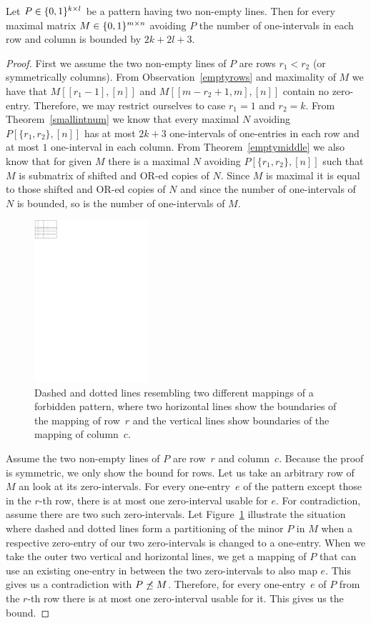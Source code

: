 \begin{lemma}
Let $P\in\{0,1\}^{k\times l}$ be a pattern having two non-empty lines. Then for every maximal matrix $M\in\{0,1\}^{m\times n}$ avoiding $P$ the number of one-intervals in each row and column is bounded by $2k+2l+3$. 
\end{lemma}
\begin{proof}
First we assume the two non-empty lines of $P$ are rows $r_1<r_2$ (or symmetrically columns). From Observation~\ref{emptyrows} and maximality of $M$ we have that $M[[r_1-1],[n]]$ and $M[[m-r_2+1,m],[n]]$ contain no zero-entry. Therefore, we may restrict ourselves to case $r_1=1$ and $r_2=k$. From Theorem~\ref{smallintnum} we know that every maximal $N$ avoiding $P[\{r_1,r_2\},[n]]$ has at most $2k+3$ one-intervals of one-entries in each row and at most $1$ one-interval in each column. From Theorem~\ref{emptymiddle} we also know that for given $M$ there is a  maximal $N$ avoiding $P[\{r_1,r_2\},[n]]$ such that $M$ is submatrix of shifted and OR-ed copies of $N$. Since $M$ is maximal it is equal to those shifted and OR-ed copies of $N$ and since the number of one-intervals of $N$ is bounded, so is the number of one-intervals of $M$.

\begin{figure}[!ht]
\centering
\includegraphics[height=60mm]{img/twolines.pdf}
\caption{Dashed and dotted lines resembling two different mappings of a forbidden pattern, where two horizontal lines show the boundaries of the mapping of row~$r$ and the vertical lines show boundaries of the mapping of column~$c$.}
\label{twolines}
\end{figure}
Assume the two non-empty lines of $P$ are row~$r$ and column~$c$. Because the proof is symmetric, we only show the bound for rows. Let us take an arbitrary row of $M$ an look at its zero-intervals. For every one-entry~$e$ of the pattern except those in the $r$-th row, there is at most one zero-interval usable for $e$. For contradiction, assume there are two such zero-intervals. Let Figure~\ref{twolines} illustrate the situation where dashed  and dotted lines form a partitioning of the minor $P$ in $M$ when a respective zero-entry of our two zero-intervals is changed to a one-entry. When we take the outer two vertical and horizontal lines, we get a mapping of $P$ that can use an existing one-entry in between the two zero-intervals to also map $e$. This gives us a contradiction with $P\not\preceq M$. Therefore, for every one-entry~$e$ of $P$ from the $r$-th row there is at most one zero-interval usable for it. This gives us the bound.
\end{proof}

